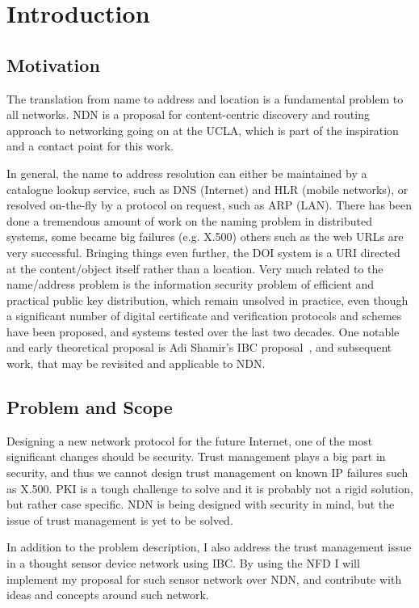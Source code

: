 \chapter{Introduction}\label{chp:introduction} 

\section{Motivation}
The translation from name to address and location is a fundamental problem to all networks.
\gls{NDN} is a proposal for content-centric discovery and routing approach to networking
going on at the \gls{UCLA}, which is part of the inspiration and a contact point for this work.

In general, the name to address resolution can either be maintained by a catalogue lookup service, 
such as \gls{DNS} (Internet) and \gls{HLR} (mobile networks), 
or resolved on-the-fly by a protocol on request, such as \gls{ARP} (\gls{LAN}). 
There has been done a tremendous amount of work on the naming problem in distributed systems, 
some became big failures (e.g. X.500) others such as the web \gls{URL}s are very successful. 
Bringing things even further, the \gls{DOI} system is a \gls{URI} directed at the content/object itself rather than a location. 
Very much related to the name/address problem is the information security problem of efficient and practical public key distribution, 
which remain unsolved in practice, even though a significant number of digital certificate and verification protocols and schemes have been proposed, and systems tested over the last two decades. 
One notable and early theoretical proposal is Adi Shamir's \gls{IBC} proposal~\cite{DBLP:conf/crypto/Shamir84},
and subsequent work, that may be revisited and applicable to \gls{NDN}.

\section{Problem and Scope}

Designing a new network protocol for the future Internet, one of the most significant changes should be security.
Trust management plays a big part in security, and thus we cannot design trust management on known \gls{IP} failures such as X.500. 
\gls{PKI} is a tough challenge to solve and it is probably not a rigid solution, but rather case specific.
\gls{NDN} is being designed with security in mind, but the issue of trust management is yet to be solved.

In addition to the problem description, I also address the trust management issue in a thought sensor device network using \gls{IBC}.
By using the \gls{NFD} I will implement my proposal for such sensor network over \gls{NDN}, and contribute with ideas and concepts around such network.

